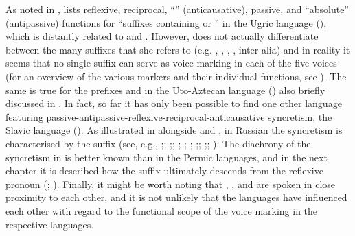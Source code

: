 As noted in , \citet{geniusiene:1987} lists reflexive, reciprocal, “” (anticausative), passive, and “absolute” (antipassive) functions for “suffixes containing  or ” in the Ugric language  (), which is distantly related to  and . However, \citeauthor{geniusiene:1987} does not actually differentiate between the many suffixes that she refers to (e.g. , , , , inter alia) and in reality it seems that no single suffix can serve as voice marking in each of the five voices (for an overview of the various markers and their individual functions, see \citealt{karoly:1982}). The same is true for the prefixes  and  in the Uto-Aztecan language  () also briefly discussed in . In fact, so far it has only been possible to find one other language featuring passive-antipassive-reflexive-reciprocal-anticausative syncretism, the Slavic language  (). As illustrated in  alongside  and , in Russian the syncretism is characterised by the suffix  (see, e.g., \citealt[40ff.]{nedjalkov:silnickij:1969};; \citealt[11f.]{faltz:1985};; \citealt{gerritsen:1990}; \citealt{israeli:1997}; \citealt[902]{kazenin:2001a}; \citealt[680f.]{knjazev:2007};; \citealt[113f.]{malchukov:2015};; \citeyear[7f.]{malchukov:2017}). The diachrony of the syncretism in  is better known than in the Permic languages, and in the next chapter it is described how the suffix  ultimately descends from the  reflexive pronoun  (\citealt[397]{kulikov:2010}; \citeyear[276]{kulikov:2013}). Finally, it might be worth noting that , , and  are spoken in close proximity to each other, and it is not unlikely that the languages have influenced each other with regard to the functional scope of the voice marking in the respective languages.

